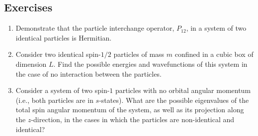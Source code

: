\subsection*{Exercises}
\begin{enumerate}[label=\thechapter.\arabic*,leftmargin=*,widest=9.20]

\item Demonstrate that the particle interchange operator, $P_{12}$, in a system of two identical particles is Hermitian.

\item Consider two identical spin-$1/2$ particles of mass $m$ confined in a cubic box of dimension $L$. Find the possible
energies and wavefunctions of this system in the case of no interaction between the particles. 

\item Consider a system of two spin-$1$ particles with no orbital angular momentum (i.e., both particles are  in $s$-states). What are
the possible eigenvalues of the total spin angular momentum of the system, as well as its projection along the $z$-direction, in the
cases in which the particles are non-identical and identical?

\end{enumerate}
